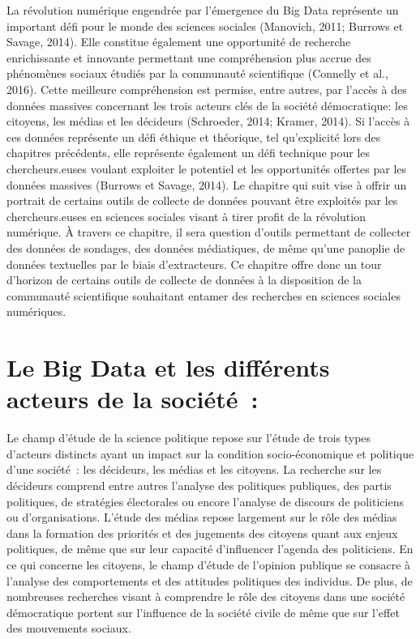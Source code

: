\documentclass[
  letterpaper,
]{scrbook}
\begin{document}
La révolution numérique engendrée par l'émergence du Big Data représente
un important défi pour le monde des sciences sociales (Manovich, 2011;
Burrows et Savage, 2014). Elle constitue également une opportunité de
recherche enrichissante et innovante permettant une compréhension plus
accrue des phénomènes sociaux étudiés par la communauté scientifique
(Connelly et al., 2016). Cette meilleure compréhension est permise,
entre autres, par l'accès à des données massives concernant les trois
acteurs clés de la société démocratique: les citoyens, les médias et les
décideurs (Schroeder, 2014; Kramer, 2014). Si l'accès à ces données
représente un défi éthique et théorique, tel qu'explicité lors des
chapitres précédents, elle représente également un défi technique pour
les chercheurs.euses voulant exploiter le potentiel et les opportunités
offertes par les données massives (Burrows et Savage, 2014). Le chapitre
qui suit vise à offrir un portrait de certains outils de collecte de
données pouvant être exploités par les chercheurs.euses en sciences
sociales visant à tirer profit de la révolution numérique. À travers ce
chapitre, il sera question d'outils permettant de collecter des données
de sondages, des données médiatiques, de même qu'une panoplie de données
textuelles par le biais d'extracteurs. Ce chapitre offre donc un tour
d'horizon de certains outils de collecte de données à la disposition de
la communauté scientifique souhaitant entamer des recherches en sciences
sociales numériques.

\hypertarget{le-big-data-et-les-diffuxe9rents-acteurs-de-la-sociuxe9tuxe9}{%
\section{\texorpdfstring{\textbf{Le Big Data et les différents acteurs
de la
société~:}}{Le Big Data et les différents acteurs de la société~:}}\label{le-big-data-et-les-diffuxe9rents-acteurs-de-la-sociuxe9tuxe9}}

Le champ d'étude de la science politique repose sur l'étude de trois
types d'acteurs distincts ayant un impact sur la condition
socio-économique et politique d'une société~: les décideurs, les médias
et les citoyens. La recherche sur les décideurs comprend entre autres
l'analyse des politiques publiques, des partis politiques, de stratégies
électorales ou encore l'analyse de discours de politiciens ou
d'organisations. L'étude des médias repose largement sur le rôle des
médias dans la formation des priorités et des jugements des citoyens
quant aux enjeux politiques, de même que sur leur capacité d'influencer
l'agenda des politiciens. En ce qui concerne les citoyens, le champ
d'étude de l'opinion publique se consacre à l'analyse des comportements
et des attitudes politiques des individus. De plus, de nombreuses
recherches visant à comprendre le rôle des citoyens dans une société
démocratique portent sur l'influence de la société civile de même que
sur l'effet des mouvements sociaux.
\end{document}
